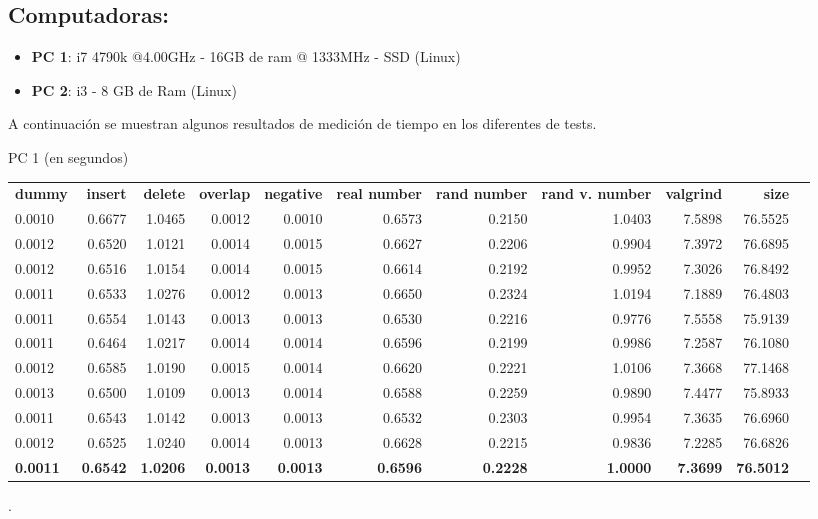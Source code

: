 \documentclass[a4paper, 12pt]{article}
\begin{document}
\subsection{Computadoras:}
\begin{itemize}
\item \textbf{PC 1}: i7 4790k @4.00GHz - 16GB de ram @ 1333MHz - SSD (Linux)
\item \textbf{PC 2}: i3 - 8 GB de Ram  (Linux)
\end{itemize}

\newpage
A continuación se muestran algunos resultados de medición de tiempo en los diferentes de tests. 
\begin{adjustwidth}{-2.5 cm}{-2.5 cm}\centering\begin{threeparttable}[!htb]
\caption{PC 1 (en segundos)}\label{tab: }
\scriptsize
\begin{tabular}{lrrrrrrrrrr}\toprule
\textbf{dummy} &\textbf{insert} &\textbf{delete} &\textbf{overlap} &\textbf{negative} &\textbf{real number} &\textbf{rand number} &\textbf{rand v. number} &\textbf{valgrind} &\textbf{size} \\\cmidrule{1-10}
0.0010 &0.6677 &1.0465 &0.0012 &0.0010 &0.6573 &0.2150 &1.0403 &7.5898 &76.5525 \\\cmidrule{1-10}
0.0012 &0.6520 &1.0121 &0.0014 &0.0015 &0.6627 &0.2206 &0.9904 &7.3972 &76.6895 \\\cmidrule{1-10}
0.0012 &0.6516 &1.0154 &0.0014 &0.0015 &0.6614 &0.2192 &0.9952 &7.3026 &76.8492 \\\cmidrule{1-10}
0.0011 &0.6533 &1.0276 &0.0012 &0.0013 &0.6650 &0.2324 &1.0194 &7.1889 &76.4803 \\\cmidrule{1-10}
0.0011 &0.6554 &1.0143 &0.0013 &0.0013 &0.6530 &0.2216 &0.9776 &7.5558 &75.9139 \\\cmidrule{1-10}
0.0011 &0.6464 &1.0217 &0.0014 &0.0014 &0.6596 &0.2199 &0.9986 &7.2587 &76.1080 \\\cmidrule{1-10}
0.0012 &0.6585 &1.0190 &0.0015 &0.0014 &0.6620 &0.2221 &1.0106 &7.3668 &77.1468 \\\cmidrule{1-10}
0.0013 &0.6500 &1.0109 &0.0013 &0.0014 &0.6588 &0.2259 &0.9890 &7.4477 &75.8933 \\\cmidrule{1-10}
0.0011 &0.6543 &1.0142 &0.0013 &0.0013 &0.6532 &0.2303 &0.9954 &7.3635 &76.6960 \\\midrule
0.0012 &0.6525 &1.0240 &0.0014 &0.0013 &0.6628 &0.2215 &0.9836 &7.2285 &76.6826 \\
\textbf{0.0011} &\textbf{0.6542} &\textbf{1.0206} &\textbf{0.0013} &\textbf{0.0013} &\textbf{0.6596} &\textbf{0.2228} &\textbf{1.0000} &\textbf{7.3699} &\textbf{76.5012} \\
\bottomrule
\end{tabular}
.\end{threeparttable}\end{adjustwidth}
\end{document}
